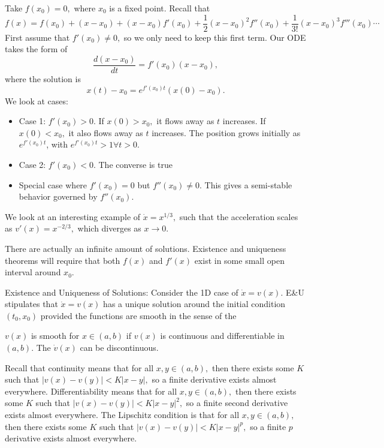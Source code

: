 \documentclass{article}
\numberwithin{equation}{section}
\begin{document}
Take $f(x_0)=0,$ where $x_0$ is a fixed point. Recall that 
\begin{equation*}
    f(x) = f(x_0) + (x-x_0) + (x-x_0)f'(x_0) + \frac{1}{2}(x-x_0)^2f''(x_0) + \frac{1}{3!}(x-x_0)^3 f'''(x_0)\cdots
\end{equation*}
First assume that $f'(x_0) \neq 0,$ so we only need to keep this first term. Our ODE takes the form of 
\begin{equation*}
    \frac{d(x-x_0)}{dt} = f'(x_0)(x-x_0), 
\end{equation*}
where the solution is 
\begin{equation*}
    x(t)-x_0 = e^{f'(x_0)t}(x(0)-x_0).
\end{equation*}
We look at cases:
\begin{itemize}
    \item Case 1: $f'(x_0) > 0.$ If $x(0)>x_0,$ it flows away as $t$ increases. If $x(0)<x_0,$ it also flows away as $t$ increases. The position grows initially as $e^{f'(x_0)t}$, with $e^{f'(x_0)t} > 1 \forall t >0.$
    \item Case 2: $f'(x_0) < 0.$ The converse is true
    \item Special case where $f'(x_0) = 0$ but $f''(x_0) \neq 0.$ This gives a semi-stable behavior governed by $f''(x_0).$
\end{itemize}
\begin{example}
    We look at an interesting example of $\dot{x} = x^{1/3},$ such that the acceleration scales as $v'(x) = x^{-2/3},$ which diverges as $x\to 0.$
    \vspace{2mm}

    There are actually an infinite amount of solutions. Existence and uniqueness theorems will require that both $f(x)$ and $f'(x)$ exist in some small open interval around $x_0.$
\end{example}
\begin{theorem}
    Existence and Uniqueness of Solutions: Consider the 1D case of $\dot{x} = v(x).$ E\&U stipulates that $\dot{x} = v(x)$ has a unique solution around the initial condition $(t_0,x_0)$ provided the functions are smooth in the sense of the 
\end{theorem}
\begin{definition}
    $v(x)$ is smooth for $x \in (a,b)$ if $v(x)$ is continuous and differentiable in $(a,b).$ The $\dot{v}(x)$ can be discontinuous.
    \vspace{2mm}
\end{definition}
Recall that continuity means that for all $x,y\in (a,b),$ then there exists some $K$ such that $|v(x)-v(y)| < K|x-y|,$ so a finite derivative exists almost everywhere. Differentiability means that for all $x,y\in (a,b),$ then there exists some $K$ such that $|v(x)-v(y)| < K|x-y|^2,$ so a finite second derivative exists almost everywhere. The Lipschitz condition is that for all $x,y\in (a,b),$ then there exists some $K$ such that $|v(x)-v(y)| < K|x-y|^p,$ so a finite $p$ derivative exists almost everywhere.
\end{document}
